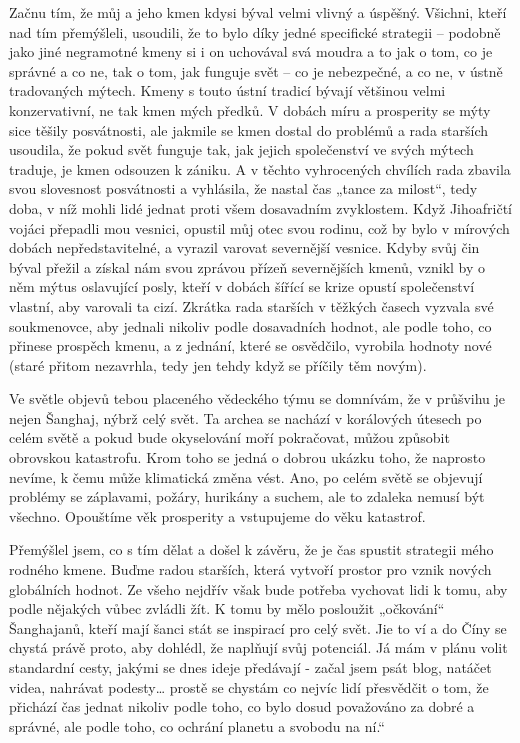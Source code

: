 Začnu tím, že můj a jeho kmen kdysi býval velmi vlivný a úspěšný. Všichni, kteří nad tím přemýšleli, usoudili, že to bylo díky jedné specifické strategii – podobně jako jiné negramotné kmeny si i on uchovával svá moudra a to jak o tom, co je správné a co ne, tak o tom, jak funguje svět  – co je nebezpečné, a co ne, v ústně tradovaných mýtech. Kmeny s touto ústní tradicí bývají většinou velmi konzervativní, ne tak kmen mých předků. V dobách míru a prosperity se mýty sice těšily posvátnosti, ale jakmile se kmen dostal do problémů a rada starších usoudila, že pokud svět funguje tak, jak jejich společenství ve svých mýtech traduje, je kmen odsouzen k zániku. A v těchto vyhrocených chvílích rada zbavila svou slovesnost posvátnosti a vyhlásila, že nastal čas „tance za milost“, tedy doba, v níž mohli lidé jednat proti všem dosavadním zvyklostem. Když Jihoafričtí vojáci přepadli mou vesnici, opustil můj otec svou rodinu, což by bylo v mírových dobách nepředstavitelné, a vyrazil varovat severnější vesnice. Kdyby svůj čin býval přežil a získal nám svou zprávou přízeň severnějších kmenů, vznikl by o něm mýtus oslavující posly, kteří v dobách šířící se krize opustí společenství vlastní, aby varovali ta cizí. Zkrátka rada starších v těžkých časech vyzvala své soukmenovce, aby jednali nikoliv podle dosavadních hodnot, ale podle toho, co přinese prospěch kmenu, a z jednání, které se osvědčilo, vyrobila hodnoty nové (staré přitom nezavrhla, tedy jen tehdy když se příčily těm novým). 

Ve světle objevů tebou placeného vědeckého týmu se domnívám, že v průšvihu je nejen Šanghaj, nýbrž celý svět. Ta archea se nachází v korálových útesech po celém světě a pokud bude okyselování moří pokračovat, můžou způsobit obrovskou katastrofu. Krom toho se jedná o dobrou ukázku toho, že naprosto nevíme, k čemu může klimatická změna vést. Ano, po celém světě se objevují problémy se záplavami, požáry, hurikány a suchem, ale to zdaleka nemusí být všechno. Opouštíme věk prosperity a vstupujeme do věku katastrof.

Přemýšlel jsem, co s tím dělat a došel k závěru, že je čas spustit strategii mého rodného kmene. Buďme radou starších, která vytvoří prostor pro vznik nových globálních hodnot. Ze všeho nejdřív však bude potřeba vychovat lidi k tomu, aby podle nějakých vůbec zvládli žít. K tomu by mělo posloužit „očkování“ Šanghajanů, kteří mají šanci stát se inspirací pro celý svět. Jie to ví a do Číny se chystá právě proto, aby dohlédl, že naplňují svůj potenciál. Já mám v plánu volit standardní cesty, jakými se dnes ideje předávají - začal jsem psát blog, natáčet videa, nahrávat podesty… prostě se chystám co nejvíc lidí přesvědčit o tom, že přichází čas jednat nikoliv podle toho, co bylo dosud považováno za dobré a správné, ale podle toho, co ochrání planetu a svobodu na ní.“

